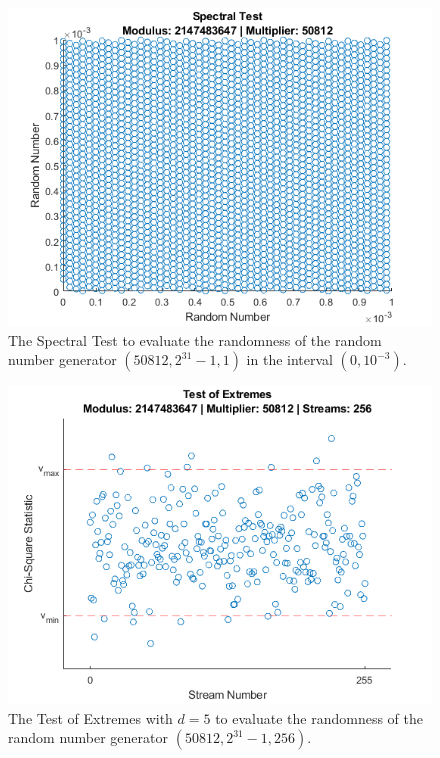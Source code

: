 \begin{figure}
	\includegraphics[width=\columnwidth]{fig/evaluation-randomness-spectral-50812}
	\caption{The Spectral Test to evaluate the randomness of the random number generator $(50812,2^{31}-1, 1)$ in the interval $(0, 10^{-3})$.}
	\label{fig:evaluation-randomness-spectral-50812}
\end{figure}

\begin{figure}
	\includegraphics[width=\columnwidth]{fig/evaluation-randomness-extremes-50812}
	\caption{The Test of Extremes with $d=5$ to evaluate the randomness of the random number generator $(50812,2^{31}-1, 256)$.}
	\label{fig:evaluation-randomness-extremes-50812}
\end{figure}

